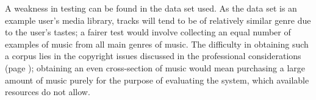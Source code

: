 A weakness in testing can be found in the data set used. As the data set is an example user's media library, tracks will tend to be of relatively similar genre due to the user's tastes; a fairer test would involve collecting an equal number of examples of music from all main genres of music. The difficulty in obtaining such a corpus lies in the copyright issues discussed in the professional considerations (page \pageref{text:spec:profcons}); obtaining an even cross-section of music would mean purchasing a large amount of music purely for the purpose of evaluating the system, which available resources do not allow.
\begin{comment}
	\item NaN problems
	\item requirement of pre-processing tracks, speed of processing
	\item similarity measure could have higher accuracy
	\item similarity measure doesn't consider mood or genre
	\item explain why the system doesn't have provisions for exploring the library (variance)
	\item Album effect, \citet*{Kim2006}
	\item evaluating similarity measures \citet*{Aucouturier2004}
	\item Automatic Music Transcription, transcription problem, symbolic similarity measure from subsymbolic data \citet*{Aucouturier2004}
	\item Structure \citet*{Bruderer2006}
	\item Refinement, training and optimisation, \citet*{Muellensiefen2004}
	\item Local search, constraint satisfaction \citet*{Vossen2005}
\end{comment}
